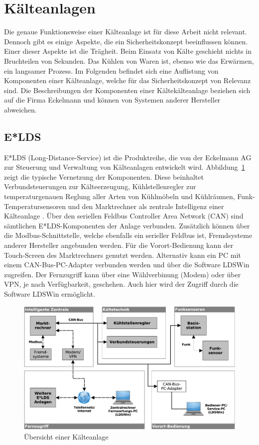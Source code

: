 \documentclass[11pt,a4paper]{report}
\begin{document}
\section{Kälteanlagen}

Die genaue Funktionsweise einer Kälteanlage ist für diese Arbeit nicht relevant. Dennoch gibt es einige Aspekte, die ein Sicherheitskonzept beeinflussen können. Einer dieser Aspekte ist die Trägheit. Beim Einsatz von Kälte geschieht nichts in Bruchteilen von Sekunden. Das Kühlen von Waren ist, ebenso wie das Erwärmen, ein langsamer Prozess. Im Folgenden befindet sich eine Auflistung von Komponenten einer Kälteanlage, welche für das Sicherheitskonzept von Relevanz sind. Die Beschreibungen der Komponenten einer Kältekälteanlage beziehen sich auf die Firma Eckelmann und können von Systemen anderer Hersteller abweichen.

\subsection{E*LDS}

E*LDS (Long-Distance-Service) ist die Produktreihe, die von der Eckelmann AG zur Steuerung und Verwaltung von Kälteanlagen entwickelt wird. Abbildung~\ref{fig:kaelteanlage} zeigt die typische Vernetzung der Komponenten. Diese beinhaltet Verbundsteuerungen zur Kälteerzeugung, Kühlstellenregler zur temperaturgenauen Reglung aller Arten von Kühlmöbeln und Kühlräumen, Funk-Temperatursensoren und den Marktrechner als zentrale Intelligenz einer Kälteanlage \cite{elds}. Über den seriellen Feldbus Controller Area Network (CAN) sind sämtlichen E*LDS-Komponenten der Anlage verbunden. Zusätzlich können über die Modbus-Schnittstelle, welche ebenfalls ein serieller Feldbus ist, Fremdsysteme anderer Hersteller angebunden werden. Für die Vorort-Bedienung kann der Touch-Screen des Marktrechners genutzt werden. Alternativ kann ein PC mit einem CAN-Bus-PC-Adapter verbunden werden und über die Software LDSWin zugreifen. Der Fernzugriff kann über eine Wählverbinung (Modem) oder über VPN, je nach Verfügbarkeit, geschehen. Auch hier wird der Zugriff durch die Software LDSWin ermöglicht.

\begin{figure}[htbp]
\centering
\includegraphics[scale=0.65]{images/kaelteanlage_uebersicht.pdf}
\caption{Übersicht einer Kälteanlage}
\label{fig:kaelteanlage}
\end{figure}
\end{document}
